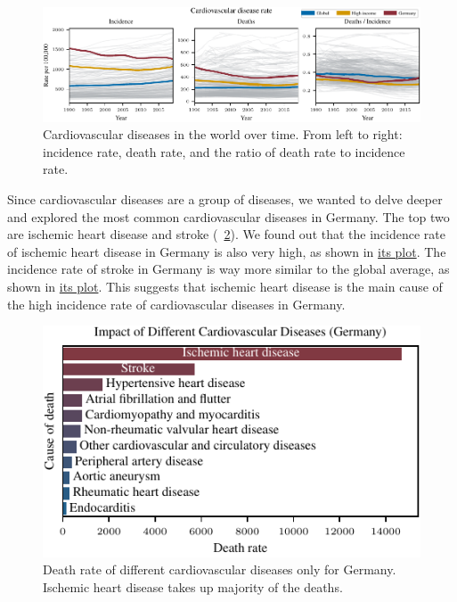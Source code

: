 \begin{figure}[h]
    \vskip 0.2in
    \centering
    \centerline{\includegraphics[]{fig/fig_cardiovascular_disease_rate.pdf}}
    \caption{Cardiovascular diseases in the world over time. From left to right: incidence rate, death rate, 
    and the ratio of death rate to incidence rate.}
    \label{Cardiovascular diseases over time}
\end{figure}

Since cardiovascular diseases are a group of diseases, we wanted to delve deeper and explored the most common cardiovascular diseases in Germany. The top two are ischemic heart disease and stroke (\figurename~\ref{Impact of Different CVDs}). 
We found out that the incidence rate of ischemic heart disease in Germany is also very high, as shown in \href{https://github.com/sykoravojtech/IHD_germany_2024/blob/main/doc/IHD_germany_2024/fig/fig_ischemic_rate.pdf}{its plot}.
The incidence rate of stroke in Germany is way more similar to the global average, as shown in \href{https://github.com/sykoravojtech/IHD_germany_2024/blob/main/doc/IHD_germany_2024/fig/fig_stroke_rate.pdf}{its plot}. This suggests that ischemic heart disease is the main cause of the high incidence rate of cardiovascular diseases in Germany.

\begin{figure}[ht]
    \vskip 0.2in
    \begin{center}
    \centerline{\includegraphics[width=\columnwidth]{fig/fig_ImpactOfDifferentCVDs.pdf}}
    \caption{Death rate of different cardiovascular diseases only for Germany. Ischemic heart disease takes up majority of the deaths.}
    \label{Impact of Different CVDs}
    \end{center}
    \vskip -0.2in
\end{figure}

